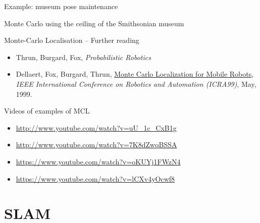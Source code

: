 \documentclass[compress,xcolor=table]{beamer}
\begin{document}
\begin{frame}{Example: museum pose maintenance}

Monte Carlo using the ceiling of the Smithsonian museum

    \begin{center}
    \end{center}

\end{frame}

\begin{frame}{Monte-Carlo Localisation -- Further reading}

    \begin{itemize}
        \item Thrun, Burgard, Fox, \emph{Probabilistic Robotics}
        \item Dellaert, Fox, Burgard, Thrun,
            \href{http://www.ri.cmu.edu/publication_view.html?pub_id=533}{Monte
            Carlo Localization for Mobile Robots}, \emph{IEEE International
            Conference on Robotics and Automation (ICRA99)}, May, 1999.

    \end{itemize}

    Videos of examples of MCL

    \begin{itemize}
        \item \url{http://www.youtube.com/watch?v=uU_1c_CxB1g}
        \item \url{http://www.youtube.com/watch?v=7K8dZwqBSSA}
        \item \url{https://www.youtube.com/watch?v=oKUYj1FWzN4}
        \item \url{https://www.youtube.com/watch?v=lCXv4yOcwf8}
    \end{itemize}

\end{frame}

\section{SLAM}
\end{document}
